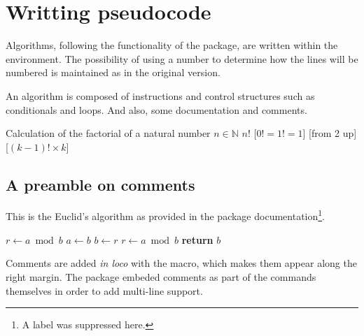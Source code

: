 \documentclass[a4paper, 11pt]{article}
\begin{document}
\section{Writting pseudocode}
Algorithms, following the functionality of the  package, are written within the  environment. The possibility of using a number to determine how the lines will be numbered is maintained as in the original version.

An algorithm is composed of instructions and control structures such as conditionals and loops. And also, some documentation and comments.

\begin{tcblisting}{}
    \begin{algorithmic}
        \Description Calculation of the factorial of a natural number
        \Input $n \in \mathbb{N}$
        \Output $n!$
        \Statex
        [$0! = 1! = 1$]
        [from 2 up]
            [$(k-1)! \times k$]
        \EndFor
    \end{algorithmic}
\end{tcblisting}

\subsection{A preamble on comments}\label{sec:a-preamble-on-comments}
This is the Euclid's algorithm as provided in the  package documentation\footnote{A label was suppressed here.}.

\begingroup
\begin{tcblisting}{}
    \begin{algorithmic}[1]
            \State $r\gets a\bmod b$
                \State $a\gets b$
                \State $b\gets r$
                \State $r\gets a\bmod b$
            \EndWhile
            \State \textbf{return} $b$
        \EndProcedure
    \end{algorithmic}
\end{tcblisting}
\endgroup

Comments are added \textit{in loco} with the  macro, which makes them appear along the right margin. The  package embeded comments as part of the commands themselves in order to add multi-line support.
\end{document}
